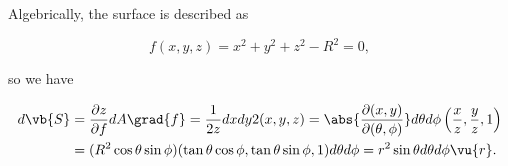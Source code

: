 \documentclass[english,a4paper,12pt]{report}
\begin{document}
Algebrically, the surface is described as 

\begin{equation}
	f(x,y,z) = x^2+y^2+z^2 - R^2 = 0,
\end{equation}

so we have

\begin{equation}
	\begin{aligned} 
	d\vb{S} &= \frac{\partial z}{\partial f} dA \grad{f} = \frac{1}{2z} dxdy 2(x,y,z) = \abs{\frac{\partial (x,y)}{\partial (\theta ,\phi )} }d \theta d\phi \left(\frac{x}{z},\frac{y}{z},1  \right) \\
	&= (R^2\cos \theta \sin \phi )(\tan \theta \cos \phi , \tan \theta \sin \phi ,1) d \theta d \phi  = r^2\sin \theta d \theta d\phi \vu{r} .
	\end{aligned} 
\end{equation}
\end{document}
